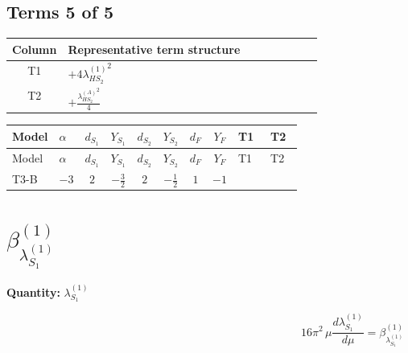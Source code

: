 \documentclass[8pt]{article}
\begin{document}
\begin{landscape}
\subsection*{Terms 5 of 5}
\begin{center}
\begin{tabular}{@{}c >{\raggedright\arraybackslash}p{0.82\linewidth}@{}}
\toprule
Column & Representative term structure \\
\midrule
T1 & \(\displaystyle +4 {\lambda_{HS_2}^{(1)}}^2\) \\
\midrule
T2 & \(\displaystyle +\frac{{\lambda_{HS_2}^{(A)}}^2}{4}\) \\
\midrule
\bottomrule
\end{tabular}
\end{center}
\smallskip
\tiny
\begin{longtable}{@{}llcccccc >{\raggedright\arraybackslash}p{0.21\linewidth} >{\raggedright\arraybackslash}p{0.21\linewidth}@{}}
\toprule
Model & $\alpha$ & $d_{S_1}$ & $Y_{S_1}$ & $d_{S_2}$ & $Y_{S_2}$ & $d_F$ & $Y_F$ & T1 & T2 \\
\midrule
\endfirsthead
\toprule
Model & $\alpha$ & $d_{S_1}$ & $Y_{S_1}$ & $d_{S_2}$ & $Y_{S_2}$ & $d_F$ & $Y_F$ & T1 & T2 \\
\midrule
\endhead
T3-B & $-3$ & $2$ & $-\frac{3}{2}$ & $2$ & $-\frac{1}{2}$ & $1$ & $-1$ & \scriptsize\adjustbox{max width=\linewidth}{$\begin{gathered} +4 {\lambda_{HS_2}^{(1)}}^2\end{gathered}$} & \scriptsize\adjustbox{max width=\linewidth}{$\begin{gathered} +\frac{{\lambda_{HS_2}^{(A)}}^2}{4}\end{gathered}$} \\
\midrule
\bottomrule
\end{longtable}
\clearpage
\section*{$\beta_{\lambda_{S_1}^{(1)}}^{(1)}$}
\noindent\textbf{Quantity: }$\lambda_{S_1}^{(1)}$\par\smallskip
\[16\pi^2\,\mu\frac{d \lambda_{S_1}^{(1)}}{d\mu}=\beta_{\lambda_{S_1}^{(1)}}^{(1)}\]

\end{landscape}
\end{document}
